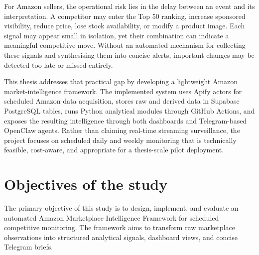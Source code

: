 For Amazon sellers, the operational risk lies in the delay between an
event and its interpretation. A competitor may enter the Top 50 ranking,
increase sponsored visibility, reduce price, lose stock availability, or
modify a product image. Each signal may appear small in isolation, yet
their combination can indicate a meaningful competitive move. Without an
automated mechanism for collecting these signals and synthesising them
into concise alerts, important changes may be detected too late or missed
entirely.

This thesis addresses that practical gap by developing a lightweight
Amazon market-intelligence framework. The implemented system uses Apify
actors for scheduled Amazon data acquisition, stores raw and derived data
in Supabase PostgreSQL tables, runs Python analytical modules through
GitHub Actions, and exposes the resulting intelligence through both
dashboards and Telegram-based OpenClaw agents. Rather than claiming
real-time streaming surveillance, the project focuses on scheduled daily
and weekly monitoring that is technically feasible, cost-aware, and
appropriate for a thesis-scale pilot deployment.

\section{Objectives of the study}

The primary objective of this study is to design, implement, and evaluate
an automated Amazon Marketplace Intelligence Framework for scheduled
competitive monitoring. The framework aims to transform raw marketplace
observations into structured analytical signals, dashboard views, and
concise Telegram briefs.

